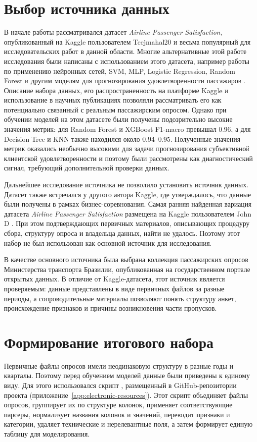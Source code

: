 \documentclass[14pt,a4paper]{extreport}
\begin{document}
\section{Выбор источника данных}
В начале работы рассматривался датасет \textit{Airline Passenger Satisfaction}, опубликованный на Kaggle пользователем Teejmahal20 \cite{kaggle-old} и весьма популярный для исследовательских работ в данной области. Многие альтернативные этой работе исследования были написаны с использованием этого датасета, например работы по применению нейронных сетей, SVM, MLP, Logistic Regression, Random Forest и другим моделям для прогнозирования удовлетворенности пассажиров \cite{du-airline-nn,mirzahossein-airline-importance,xue-airline-satisfaction,ichhaporia-airline-ml,salah-airline-eda}. Описание набора данных, его распространенность на платформе Kaggle и использование в научных публикациях позволяли рассматривать его как потенциально связанный с реальным пассажирским опросом. Однако при обучении моделей на этом датасете были получены подозрительно высокие значения метрик: для Random Forest и XGBoost F1-macro превышал 0.96, а для Decision Tree и KNN также находился около 0.94--0.95. Полученные значения метрик оказались необычно высокими для задачи прогнозирования субъективной клиентской удовлетворенности и поэтому были рассмотрены как диагностический сигнал, требующий дополнительной проверки данных.

Дальнейшее исследование источника не позволило установить источник данных. Датасет также встречался у другого автора Kaggle, где утверждалось, что данные были получены в рамках бизнес-соревнования. Самая ранняя найденная вариация датасета \textit{Airline Passenger Satisfaction} размещена на Kaggle пользователем John D \cite{john-customer-satisfaction}. При этом подтверждающих первичных материалов, описывающих процедуру сбора, структуру опроса и владельца данных, найти не удалось. Поэтому этот набор не был использован как основной источник для исследования.

В качестве основного источника была выбрана коллекция пассажирских опросов Министерства транспорта Бразилии, опубликованная на государственном портале открытых данных. В отличие от Kaggle-датасета, этот источник является проверяемым: данные представлены в виде первичных файлов за разные периоды, а сопроводительные материалы позволяют понять структуру анкет, происхождение признаков и причины возникновения части пропусков.

\section{Формирование итогового набора}
Первичные файлы опросов имели неодинаковую структуру в разные годы и кварталы. Поэтому перед обучением моделей данные были приведены к единому виду. Для этого использовался скрипт , размещенный в GitHub-репозитории проекта (приложение~\ref{app:electronic-resources}). Этот скрипт объединяет файлы опросов, группирует их по структуре колонок, применяет соответствующие парсеры, нормализует названия колонок и значений, переводит признаки и категории, удаляет технические и нерелевантные поля, а затем формирует единую таблицу для моделирования.
\end{document}
